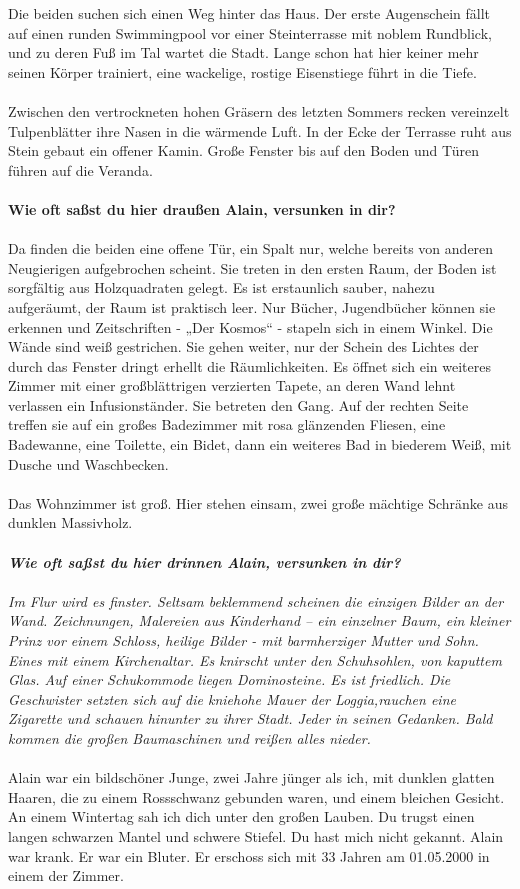 {Die beiden suchen sich einen Weg hinter das Haus. Der erste Augenschein fällt auf einen runden Swimmingpool vor einer Steinterrasse mit noblem Rundblick, und zu deren Fuß im Tal wartet die Stadt. Lange schon hat hier keiner mehr seinen Körper trainiert, eine wackelige, rostige Eisenstiege führt in die Tiefe. \\\\
Zwischen den vertrockneten hohen Gräsern des letzten Sommers recken vereinzelt Tulpenblätter ihre Nasen in die wärmende Luft. In der Ecke der Terrasse ruht aus Stein gebaut ein offener Kamin. Große Fenster bis auf den Boden und Türen führen auf die Veranda.\\\\
\textbf{Wie oft saßst du hier draußen Alain, versunken in dir?}\\\\
Da finden die beiden eine offene Tür, ein Spalt nur, welche bereits von anderen Neugierigen aufgebrochen scheint. Sie treten in den ersten Raum, der Boden ist sorgfältig aus Holzquadraten gelegt. Es ist erstaunlich sauber, nahezu aufgeräumt, der Raum ist praktisch leer. Nur Bücher, Jugendbücher können sie erkennen und Zeitschriften - „Der Kosmos“ -  stapeln sich in einem Winkel. Die Wände sind weiß gestrichen. Sie gehen weiter, nur der Schein des Lichtes der durch das Fenster dringt erhellt die Räumlichkeiten. Es öffnet sich ein weiteres Zimmer mit einer großblättrigen verzierten Tapete, an deren Wand lehnt verlassen ein Infusionständer. Sie betreten den Gang. Auf der rechten Seite treffen sie auf ein großes Badezimmer mit rosa glänzenden Fliesen, eine Badewanne, eine Toilette, ein Bidet, dann ein weiteres Bad in biederem Weiß, mit Dusche und Waschbecken.\\\\
Das Wohnzimmer ist groß. Hier stehen einsam, zwei große mächtige Schränke aus dunklen Massivholz. \\\\}
\textit{\textbf{Wie oft saßst du hier drinnen Alain, versunken in dir?}
\\\\Im Flur wird es finster. Seltsam beklemmend scheinen die einzigen Bilder an der Wand. Zeichnungen, Malereien aus Kinderhand – ein einzelner Baum, ein kleiner Prinz vor einem Schloss, heilige Bilder - mit barmherziger Mutter und Sohn. Eines mit einem Kirchenaltar. Es knirscht unter den Schuhsohlen, von kaputtem Glas. Auf einer Schukommode liegen Dominosteine.
Es ist friedlich. Die Geschwister setzten sich auf die kniehohe Mauer der Loggia,rauchen eine Zigarette und schauen hinunter zu ihrer Stadt. Jeder in seinen Gedanken.
Bald kommen die großen Baumaschinen und reißen alles nieder.}
\\\\
Alain war ein bildschöner Junge, zwei Jahre jünger als ich, mit dunklen glatten Haaren, die zu einem Rossschwanz gebunden waren, und einem bleichen Gesicht. An einem Wintertag sah ich dich unter den großen Lauben. Du trugst einen langen schwarzen Mantel und schwere Stiefel. Du hast mich nicht gekannt. 
Alain war krank. Er war ein Bluter. Er erschoss sich mit 33 Jahren am 01.05.2000 in einem der Zimmer. 

